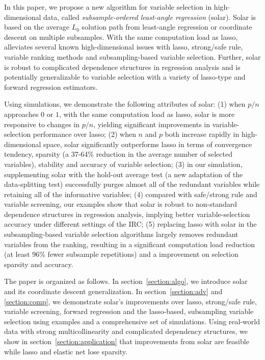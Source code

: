 \documentclass[12pt]{article}
\begin{document}
In this paper, we propose a new algorithm for variable selection in high-dimensional data, called  \emph{subsample-ordered least-angle regression} (solar). Solar is based on the average $L_0$ solution path from least-angle regression or coordinate descent on multiple subsamples. With the same computation load as lasso, alleviates several known high-dimensional issues with lasso, strong/safe rule, variable ranking methods and subsampling-based variable selection. Further, solar is robust to complicated dependence structures in regression analysis and is potentially generalizable to variable selection with a variety of lasso-type and forward regression estimators.

Using simulations, we demonstrate the following attributes of solar: (1) when $p/n$ approaches $0$ or $1$, with the same computation load as lasso, solar is more responsive to changes in $p/n$, yielding significant improvements in variable-selection performance over lasso; (2) when $n$ and $p$ both increase rapidly in high-dimensional space, solar significantly outperforms lasso in terms of convergence tendency, sparsity (a 37-64\% reduction in the average number of selected variables), stability and accuracy of variable selection; (3) in our simulation, supplementing solar with the hold-out average test (a new adaptation of the data-splitting test) successfully purges almost all of the redundant variables while retaining all of the informative variables; (4) compared with safe/strong rule and variable screening, our examples show that solar is robust to non-standard dependence structures in regression analysis, implying better variable-selection accuracy under different settings of the IRC; (5) replacing lasso with solar in the subsampling-based variable selection algorithms largely removes redundant variables from the ranking, resulting in a significant computation load reduction (at least 96\% fewer subsample repetitions) and a improvement on selection sparsity and accuracy.

The paper is organized as follows. In section~\ref{section:algo}, we introduce solar and its coordinate descent generalization. In section~\ref{section:adv} and \ref{section:comp}, we demonstrate solar's improvements over lasso, strong/safe rule, variable screening, forward regression and the lasso-based, subsampling variable selection using examples and a comprehensive set of simulations. Using real-world data with strong multicollinearity and complicated dependency structures, we show in section~\ref{section:application} that improvements from solar are feasible while lasso and elastic net lose sparsity.
\end{document}
